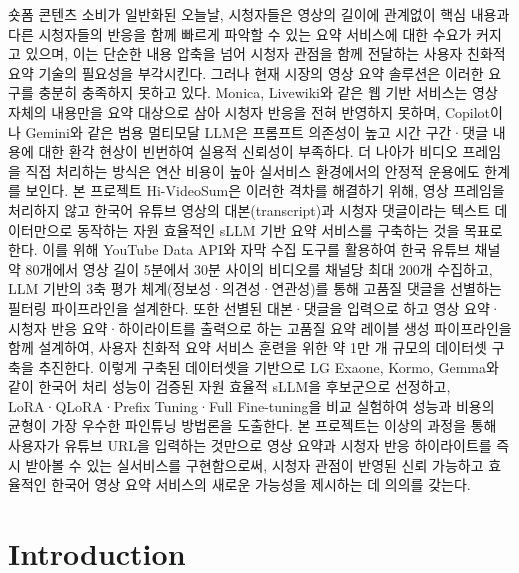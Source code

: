 \documentclass[11pt,a4paper]{article}
\begin{document}
숏폼 콘텐츠 소비가 일반화된 오늘날, 시청자들은 영상의 길이에 관계없이 핵심 내용과 다른 시청자들의 반응을 함께 빠르게 파악할 수 있는 요약 서비스에 대한 수요가 커지고 있으며, 이는 단순한 내용 압축을 넘어 시청자 관점을 함께 전달하는 사용자 친화적 요약 기술의 필요성을 부각시킨다. 그러나 현재 시장의 영상 요약 솔루션은 이러한 요구를 충분히 충족하지 못하고 있다. Monica, Livewiki와 같은 웹 기반 서비스는 영상 자체의 내용만을 요약 대상으로 삼아 시청자 반응을 전혀 반영하지 못하며, Copilot이나 Gemini와 같은 범용 멀티모달 LLM은 프롬프트 의존성이 높고 시간 구간·댓글 내용에 대한 환각 현상이 빈번하여 실용적 신뢰성이 부족하다. 더 나아가 비디오 프레임을 직접 처리하는 방식은 연산 비용이 높아 실서비스 환경에서의 안정적 운용에도 한계를 보인다. 본 프로젝트 Hi-VideoSum은 이러한 격차를 해결하기 위해, 영상 프레임을 처리하지 않고 한국어 유튜브 영상의 대본(transcript)과 시청자 댓글이라는 텍스트 데이터만으로 동작하는 자원 효율적인 sLLM 기반 요약 서비스를 구축하는 것을 목표로 한다. 이를 위해 YouTube Data API와 자막 수집 도구를 활용하여 한국 유튜브 채널 약 80개에서 영상 길이 5분에서 30분 사이의 비디오를 채널당 최대 200개 수집하고, LLM 기반의 3축 평가 체계(정보성·의견성·연관성)를 통해 고품질 댓글을 선별하는 필터링 파이프라인을 설계한다. 또한 선별된 대본·댓글을 입력으로 하고 영상 요약·시청자 반응 요약·하이라이트를 출력으로 하는 고품질 요약 레이블 생성 파이프라인을 함께 설계하여, 사용자 친화적 요약 서비스 훈련을 위한 약 1만 개 규모의 데이터셋 구축을 추진한다. 이렇게 구축된 데이터셋을 기반으로 LG Exaone, Kormo, Gemma와 같이 한국어 처리 성능이 검증된 자원 효율적 sLLM을 후보군으로 선정하고, LoRA·QLoRA·Prefix Tuning·Full Fine-tuning을 비교 실험하여 성능과 비용의 균형이 가장 우수한 파인튜닝 방법론을 도출한다. 본 프로젝트는 이상의 과정을 통해 사용자가 유튜브 URL을 입력하는 것만으로 영상 요약과 시청자 반응 하이라이트를 즉시 받아볼 수 있는 실서비스를 구현함으로써, 시청자 관점이 반영된 신뢰 가능하고 효율적인 한국어 영상 요약 서비스의 새로운 가능성을 제시하는 데 의의를 갖는다.

\section{Introduction}\label{sec:intro}
\end{document}
